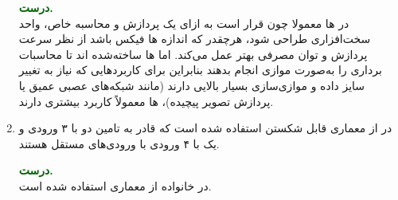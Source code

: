 \begin{enumerate}
	\begin{qsolve}
		\textbf{\textcolor{darkgreen}{درست.}}\\
		در  ها معمولا چون قرار است به ازای یک پردازش و محاسبه خاص، واحد سخت‌افزاری طراحی شود، هرچقدر که اندازه ها فیکس باشد از نظر سرعت پردازش و توان مصرفی بهتر عمل می‌کند. اما  ها ساخته‌شده اند تا محاسبات برداری را به‌صورت موازی انجام بدهند بنابراین برای کاربردهایی که نیاز به تغییر سایز داده و موازی‌سازی بسیار بالایی دارند (مانند شبکه‌های عصبی عمیق یا پردازش تصویر پیچیده)، ها معمولاً کاربرد بیشتری دارند.
	\end{qsolve}
	
	
	\item 
	در  از معماری  قابل شکستن استفاده شده است که قادر به تامین دو  با ۳ ورودی و یک  با ۴ ورودی با ورودی‌های مستقل هستند.
	
	\begin{qsolve}
		\textbf{\textcolor{darkgreen}{درست.}}\\
		در خانواده  از معماری  استفاده شده است.
	\end{qsolve}
	
\end{enumerate}